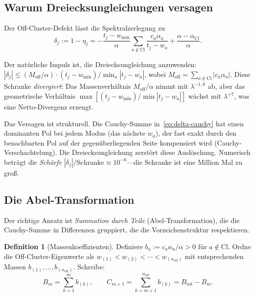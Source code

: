\documentclass[12pt,a4paper]{article}
\theoremstyle{definition}
\newtheorem{definition}[theorem]{Definition}
\theoremstyle{remark}
\newcommand{\Cl}{\mathrm{Cl}}
\newcommand{\off}{\mathrm{off}}
\newcommand{\wmin}{w_{\min}}
\begin{document}
\subsection{Warum Dreiecksungleichungen versagen}

Der Off-Cluster-Defekt lässt die Spektralzerlegung zu
\begin{equation}
\label{eq:delta-cauchy}
\delta_j := 1 - \eta_j
= -\frac{t_j - \wmin}{\alpha}
\sum_{a \notin \Cl} \frac{c_a \alpha_a}{t_j - w_a}
+ \frac{\alpha - \alpha_{\Cl}}{\alpha}.
\end{equation}

Der natürliche Impuls ist, die Dreiecksungleichung anzuwenden:
$|\delta_j| \leq (M_{\off}/\alpha) \cdot (t_j - \wmin) / \min_a |t_j - w_a|$,
wobei $M_{\off} = \sum_{a \notin \Cl} |c_a \alpha_a|$.
Diese Schranke \emph{divergiert}: Das Massenverhältnis $M_{\off}/\alpha$
nimmt mit $\lambda^{-1,8}$ ab, aber das geometrische Verhältnis
$\max[(t_j-\wmin)/\min|t_j-w_a|]$ wächst mit $\lambda^{+7}$, was
eine Netto-Divergenz erzeugt.

Das Versagen ist strukturell.
Die Cauchy-Summe in~\eqref{eq:delta-cauchy} hat einen dominanten Pol
bei jedem Modus (das nächste $w_a$), der fast exakt durch den
benachbarten Pol auf der gegenüberliegenden Seite kompensiert wird
(Cauchy-Verschachtelung). Die Dreiecksungleichung zerstört diese Auslöschung.
Numerisch beträgt die \emph{Schärfe}
$|\delta_j|/\text{Schranke} \approx 10^{-6}$---die Schranke ist eine Million
Mal zu groß.

\subsection{Die Abel-Transformation}

Der richtige Ansatz ist \emph{Summation durch Teile} (Abel-Transformation),
die die Cauchy-Summe in Differenzen gruppiert, die die Vorzeichenstruktur
respektieren.

\begin{definition}[Massenkoeffizienten]
Definiere $b_a := c_a \alpha_a / \alpha > 0$ für $a \notin \Cl$.
Ordne die Off-Cluster-Eigenwerte als $w_{(1)} < w_{(2)} < \cdots < w_{(n_{\off})}$
mit entsprechenden Massen $b_{(1)}, \ldots, b_{(n_{\off})}$.
Schreibe:
\begin{equation}
B_m = \sum_{k=1}^{m} b_{(k)}, \qquad
C_{m+1} = \sum_{k=m+1}^{n_{\off}} b_{(k)} = B_{\mathrm{tot}} - B_m.
\end{equation}
\end{definition}
\end{document}
